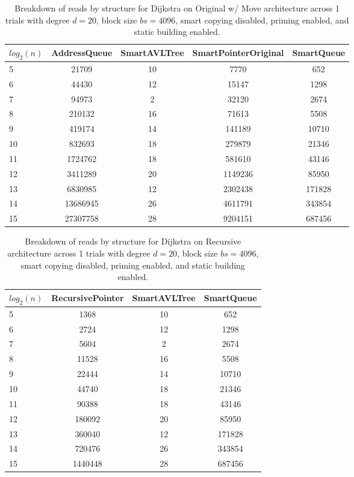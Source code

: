 \begin{table}[]
\centering
\begin{tabular}{|l|c|c|c|c|}
$log_2(n)$ & AddressQueue & SmartAVLTree & SmartPointerOriginal & SmartQueue \\ \hline
5 & 21709 & 10 & 7770 & 652 \\ \hline
6 & 44430 & 12 & 15147 & 1298 \\ \hline
7 & 94973 & 2 & 32120 & 2674 \\ \hline
8 & 210132 & 16 & 71613 & 5508 \\ \hline
9 & 419174 & 14 & 141189 & 10710 \\ \hline
10 & 832693 & 18 & 279879 & 21346 \\ \hline
11 & 1724762 & 18 & 581610 & 43146 \\ \hline
12 & 3411289 & 20 & 1149236 & 85950 \\ \hline
13 & 6830985 & 12 & 2302438 & 171828 \\ \hline
14 & 13686945 & 26 & 4611791 & 343854 \\ \hline
15 & 27307758 & 28 & 9204151 & 687456 \\ \hline
\end{tabular}
\caption{Breakdown of reads by structure for Dijkstra on Original w/ Move architecture across 1 trials with degree $d=20$, block size $bs=4096$, smart copying disabled, priming enabled, and static building enabled.}
    \label{tab:reads_by_structure_dijkstra_d20_bs4096_trials1_copiesfalse_primetrue_staticinsertiontrue_ptoriginal_movetrue}
\end{table}

\begin{table}[]
\centering
\begin{tabular}{|l|c|c|c|}
$log_2(n)$ & RecursivePointer & SmartAVLTree & SmartQueue \\ \hline
5 & 1368 & 10 & 652 \\ \hline
6 & 2724 & 12 & 1298 \\ \hline
7 & 5604 & 2 & 2674 \\ \hline
8 & 11528 & 16 & 5508 \\ \hline
9 & 22444 & 14 & 10710 \\ \hline
10 & 44740 & 18 & 21346 \\ \hline
11 & 90388 & 18 & 43146 \\ \hline
12 & 180092 & 20 & 85950 \\ \hline
13 & 360040 & 12 & 171828 \\ \hline
14 & 720476 & 26 & 343854 \\ \hline
15 & 1440448 & 28 & 687456 \\ \hline
\end{tabular}
\caption{Breakdown of reads by structure for Dijkstra on Recursive architecture across 1 trials with degree $d=20$, block size $bs=4096$, smart copying disabled, priming enabled, and static building enabled.}
    \label{tab:reads_by_structure_dijkstra_d20_bs4096_trials1_copiesfalse_primetrue_staticinsertiontrue_ptrecursive_movetrue}
\end{table}

